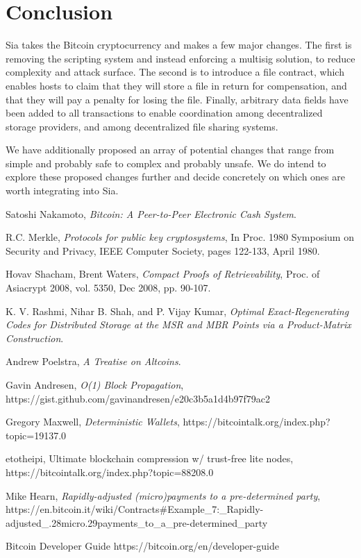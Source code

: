 \documentclass[twocolumn]{article}
\begin{document}
\section{Conclusion}
Sia takes the Bitcoin cryptocurrency and makes a few major changes.
The first is removing the scripting system and instead enforcing a multisig solution, to reduce complexity and attack surface.
The second is to introduce a file contract, which enables hosts to claim that they will store a file in return for compensation, and that they will pay a penalty for losing the file.
Finally, arbitrary data fields have been added to all transactions to enable coordination among decentralized storage providers, and among decentralized file sharing systems.

We have additionally proposed an array of potential changes that range from simple and probably safe to complex and probably unsafe.
We do intend to explore these proposed changes further and decide concretely on which ones are worth integrating into Sia.

\onecolumn
\begin{thebibliography}{9}

	Satoshi Nakamoto,
	\emph{Bitcoin: A Peer-to-Peer Electronic Cash System}.

	R.C. Merkle,
	\emph{Protocols for public key cryptosystems},
	In Proc. 1980 Symposium on Security and	Privacy,
	IEEE Computer Society, pages 122-133, April 1980.

	Hovav Shacham, Brent Waters,
	\emph{Compact Proofs of Retrievability},
	Proc. of Asiacrypt 2008, vol. 5350, Dec 2008, pp. 90-107.

	K. V. Rashmi, Nihar B. Shah, and P. Vijay Kumar,
	\emph{Optimal Exact-Regenerating Codes for Distributed Storage at the MSR and MBR Points via a Product-Matrix Construction}.

	Andrew Poelstra,
	\emph{A Treatise on Altcoins}.

	Gavin Andresen,
	\emph{O(1) Block Propagation},
	https://gist.github.com/gavinandresen/e20c3b5a1d4b97f79ac2

	Gregory Maxwell,
	\emph{Deterministic Wallets},
	https://bitcointalk.org/index.php?topic=19137.0

	etotheipi,
	Ultimate blockchain compression w/ trust-free lite nodes, \newline
	https://bitcointalk.org/index.php?topic=88208.0

	Mike Hearn,
	\emph{Rapidly-adjusted (micro)payments to a pre-determined party},\newline
	https://en.bitcoin.it/wiki/Contracts\#Example\_7:\_Rapidly-adjusted\_.28micro.29payments\_to\_a\_pre-determined\_party

	Bitcoin Developer Guide
	https://bitcoin.org/en/developer-guide


\end{thebibliography}
\end{document}
